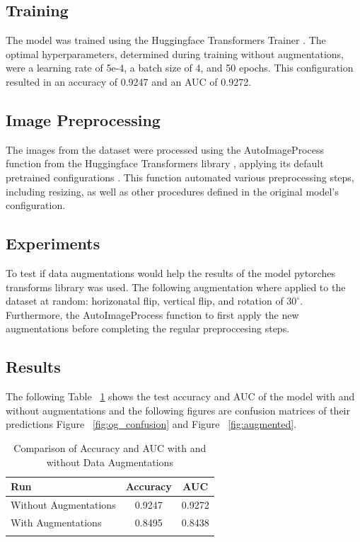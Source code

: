 \documentclass[10pt,twocolumn,letterpaper]{article}
\begin{document}
\subsection{Training}
The model was trained using the Huggingface Transformers Trainer \cite{huggingfacetrain}. The optimal hyperparameters, determined during training without augmentations, were a learning rate of 5e-4, a batch size of 4, and 50 epochs. This configuration resulted in an accuracy of 0.9247 and an AUC of 0.9272.
\subsection{Image Preprocessing}
The images from the dataset were processed using the AutoImageProcess function from the Huggingface Transformers library \cite{huggingfaceproc}, applying its default pretrained configurations \cite{huggingface}. This function automated various preprocessing steps, including resizing, as well as other procedures defined in the original model’s configuration.

\subsection{Experiments}
To test if data augmentations would help the results of the model pytorches transforms library was used\cite{}. The following augmentation where applied to the dataset at random: horizonatal flip, vertical flip, and rotation of $30^{\circ}$. Furthermore, the AutoImageProcess function \cite{huggingfaceproc} to first apply the new augmentations before completing the regular preproccesing steps.


\subsection{Results}
The following Table ~\ref{tab:augmentations_results} shows the test accuracy and AUC of the model with and without augmentations and the following figures are confusion matrices of their predictions Figure ~\ref{fig:og_confusion} and Figure ~\ref{fig:augmented}.

\begin{table}[h!]
\centering
\begin{tabular}{l|c|c|}
\hline
\bf{Run} & \bf{Accuracy} & \bf{AUC}  \\ \hline
Without Augmentations & 0.9247 & 0.9272 \\ \hline
With Augmentations & 0.8495 & 0.8438 \\ \hline
\label{tab:ACC}
\end{tabular}

\caption{Comparison of Accuracy and AUC with and without Data Augmentations}
\label{tab:augmentations_results}
\end{table}
\end{document}
